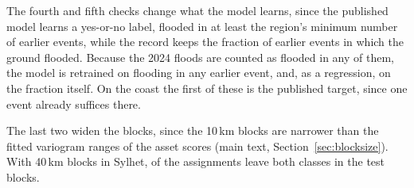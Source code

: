 \documentclass[11pt]{article}
\begin{document}
The fourth and fifth checks change what the model learns, since the published model learns a yes-or-no label, flooded in at least the region's minimum number of earlier events, while the record keeps the fraction of earlier events in which the ground flooded. Because the 2024 floods are counted as flooded in any of them, the model is retrained on flooding in any earlier event, and, as a regression, on the fraction itself. On the coast the first of these is the published target, since one event already suffices there.

The last two widen the blocks, since the 10\,km blocks are narrower than the fitted variogram ranges of the asset scores (main text, Section~\ref{sec:blocksize}). With 40\,km blocks in Sylhet, \SylhetBlockFortyTempSeeds{} of the assignments leave both classes in the test blocks.
\end{document}
